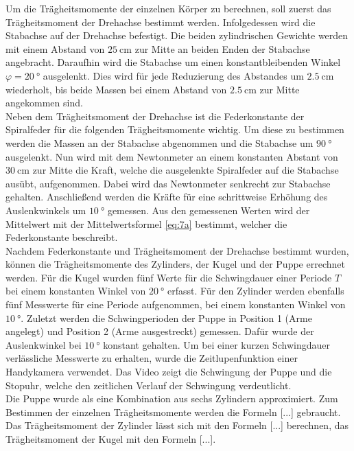 {Um die Trägheitsmomente der einzelnen Körper zu berechnen, soll zuerst das Trägheitsmoment der Drehachse bestimmt werden. Infolgedessen wird die
Stabachse auf der Drehachse befestigt. Die beiden zylindrischen Gewichte werden mit einem Abstand von $\SI{25}{\centi\meter}$ zur Mitte an beiden 
Enden der Stabachse angebracht. Daraufhin wird die Stabachse um einen konstantbleibenden Winkel $\varphi = \SI{20}{\degree}$ ausgelenkt. Dies wird
für jede Reduzierung des Abstandes um $\SI{2.5}{\centi\meter}$ wiederholt, bis beide Massen bei einem Abstand von $\SI{2.5}{\centi\meter}$ zur Mitte 
angekommen sind.\\
Neben dem Trägheitsmoment der Drehachse ist die Federkonstante der Spiralfeder für die folgenden Trägheitsmomente wichtig. Um diese zu bestimmen 
werden die Massen an der Stabachse abgenommen und die Stabachse um $\SI{90}{\degree}$ ausgelenkt. Nun wird mit dem Newtonmeter an einem konstanten Abstant von 
$\SI{30}{\centi\meter}$ zur Mitte die Kraft, welche die ausgelenkte Spiralfeder auf die Stabachse ausübt, aufgenommen. Dabei wird das Newtonmeter
senkrecht zur Stabachse gehalten. Anschließend werden die Kräfte für eine schrittweise Erhöhung des Auslenkwinkels um $\SI{10}{\degree}$ gemessen.
Aus den gemessenen Werten wird der Mittelwert mit der Mittelwertsformel \eqref{eq:7a} bestimmt, welcher die Federkonstante beschreibt.\\
Nachdem Federkonstante und Trägheitsmoment der Drehachse bestimmt wurden, können die Trägheitsmomente des Zylinders, der Kugel und der Puppe
errechnet werden. Für die Kugel wurden fünf Werte für die Schwingdauer einer Periode $T$ bei einem konstanten Winkel von $\SI{20}{\degree}$ erfasst.
Für den Zylinder werden ebenfalls fünf Messwerte für eine Periode aufgenommen, bei einem konstanten Winkel von $\SI{10}{\degree}$. 
Zuletzt werden die Schwingperioden der Puppe in Position 1 (Arme angelegt) und Position 2 (Arme ausgestreckt) gemessen. Dafür wurde der Auslenkwinkel
bei $\SI{10}{\degree}$ konstant gehalten. Um bei einer kurzen Schwingdauer verlässliche Messwerte zu erhalten, wurde die Zeitlupenfunktion einer 
Handykamera verwendet. Das Video zeigt die Schwingung der Puppe und die Stopuhr, welche den zeitlichen Verlauf der Schwingung verdeutlicht.\\
Die Puppe wurde als eine Kombination aus sechs Zylindern approximiert. 
Zum Bestimmen der einzelnen Trägheitsmomente werden die Formeln [...] gebraucht. Das Trägheitsmoment der Zylinder lässt sich mit den Formeln [...]
berechnen, das Trägheitsmoment der Kugel mit den Formeln [...].
}
